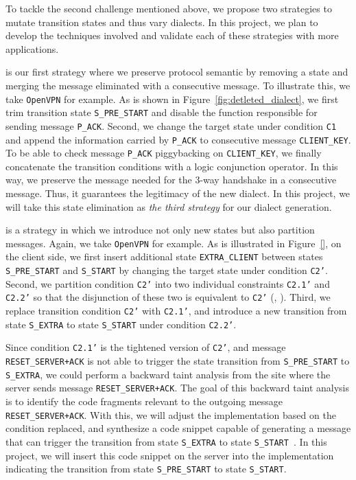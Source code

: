 To tackle the second challenge mentioned above, we propose two strategies to mutate transition states and thus vary dialects. In this project, we plan to develop the techniques involved and validate each of these strategies with more applications.    

{ is our first strategy where we preserve protocol semantic by removing a state and merging the message eliminated with a consecutive message. To illustrate this, we take \texttt{OpenVPN} for example. As is shown in Figure~\ref{fig:detleted_dialect}, we first trim transition state \texttt{S\_PRE\_START} and disable the function responsible for sending message \texttt{P\_ACK}. Second, we change the target state under condition \texttt{C1} and append the information carried by \texttt{P\_ACK} to consecutive message \texttt{CLIENT\_KEY}. To be able to check message \texttt{P\_ACK} piggybacking on \texttt{CLIENT\_KEY}, we finally concatenate the transition conditions with a logic conjunction operator. In this way, we preserve the message needed for the 3-way handshake in a consecutive message. Thus, it guarantees the legitimacy of the new dialect. In this project, we will take this state elimination as \emph{the third strategy} for our dialect generation.

{ is a strategy in which we introduce not only new states but also partition messages. Again, we take \texttt{OpenVPN} for example. As is illustrated in Figure~\ref{}, on the client side, we first insert additional state \texttt{EXTRA\_CLIENT} between states \texttt{S\_PRE\_START} and \texttt{S\_START} by changing the target state under condition \texttt{C2'}. Second, we partition condition \texttt{C2'} into two individual constraints \texttt{C2.1'} and \texttt{C2.2'} so that the disjunction of these two is equivalent to \texttt{C2'} (\ie, ). Third, we replace transition condition \texttt{C2'} with \texttt{C2.1'}, and introduce a new transition from state \texttt{S\_EXTRA} to state \texttt{S\_START} under condition \texttt{C2.2'}. 

Since condition \texttt{C2.1'} is the tightened version of \texttt{C2'}, and message \texttt{RESET\_SERVER+ACK} is not able to trigger the state transition from \texttt{S\_PRE\_START} to \texttt{S\_EXTRA}, we could perform a backward taint analysis from the site where the server sends message \texttt{RESET\_SERVER+ACK}. The goal of this backward taint analysis is to identify the code fragments relevant to the outgoing message \texttt{RESET\_SERVER+ACK}. With this, we will adjust the implementation based on the condition replaced, and synthesize a code snippet capable of generating a message that can trigger the transition from state \texttt{S\_EXTRA} to state \texttt{S\_START
}. In this project, we will insert this code snippet on the server into the implementation indicating the transition from state \texttt{S\_PRE\_START} to state \texttt{S\_START}. 

}}
